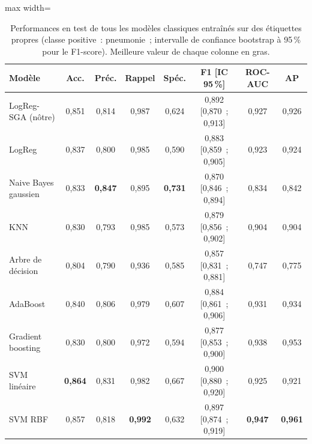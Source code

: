 \begin{table}[t]
\centering
\small
\caption{Performances en test de tous les modèles classiques entraînés sur des étiquettes propres (classe positive~: pneumonie~; intervalle de confiance bootstrap à 95\,\% pour le F1-score). Meilleure valeur de chaque colonne en gras.}
\label{tab:clean}
\begin{adjustbox}{max width=\textwidth}
\begin{tabular}{lccccccc}
\toprule
Modèle & Acc. & Préc. & Rappel & Spéc. & F1 [IC 95\,\%] & ROC-AUC & AP \\
\midrule
LogReg-SGA (nôtre) & 0,851 & 0,814 & 0,987 & 0,624 & 0,892 [0,870~; 0,913] & 0,927 & 0,926 \\
LogReg & 0,837 & 0,800 & 0,985 & 0,590 & 0,883 [0,859~; 0,905] & 0,923 & 0,924 \\
Naive Bayes gaussien & 0,833 & \textbf{0,847} & 0,895 & \textbf{0,731} & 0,870 [0,846~; 0,894] & 0,834 & 0,842 \\
KNN & 0,830 & 0,793 & 0,985 & 0,573 & 0,879 [0,856~; 0,902] & 0,904 & 0,904 \\
Arbre de décision & 0,804 & 0,790 & 0,936 & 0,585 & 0,857 [0,831~; 0,881] & 0,747 & 0,775 \\
AdaBoost & 0,840 & 0,806 & 0,979 & 0,607 & 0,884 [0,861~; 0,906] & 0,931 & 0,934 \\
Gradient boosting & 0,830 & 0,800 & 0,972 & 0,594 & 0,877 [0,853~; 0,900] & 0,938 & 0,953 \\
SVM linéaire & \textbf{0,864} & 0,831 & 0,982 & 0,667 & 0,900 [0,880~; 0,920] & 0,925 & 0,921 \\
SVM RBF & 0,857 & 0,818 & \textbf{0,992} & 0,632 & 0,897 [0,874~; 0,919] & \textbf{0,947} & \textbf{0,961} \\
\bottomrule
\end{tabular}
\end{adjustbox}
\end{table}
